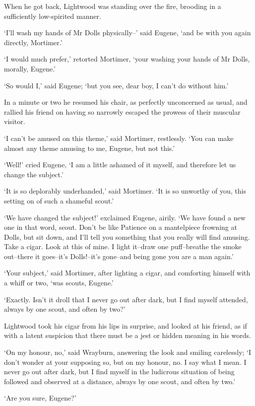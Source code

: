 When he got back, Lightwood was standing over the fire, brooding in a
sufficiently low-spirited manner.

‘I’ll wash my hands of Mr Dolls physically--’ said Eugene, ‘and be with
you again directly, Mortimer.’

‘I would much prefer,’ retorted Mortimer, ‘your washing your hands of Mr
Dolls, morally, Eugene.’

‘So would I,’ said Eugene; ‘but you see, dear boy, I can’t do without
him.’

In a minute or two he resumed his chair, as perfectly unconcerned as
usual, and rallied his friend on having so narrowly escaped the prowess
of their muscular visitor.

‘I can’t be amused on this theme,’ said Mortimer, restlessly. ‘You can
make almost any theme amusing to me, Eugene, but not this.’

‘Well!’ cried Eugene, ‘I am a little ashamed of it myself, and therefore
let us change the subject.’

‘It is so deplorably underhanded,’ said Mortimer. ‘It is so unworthy of
you, this setting on of such a shameful scout.’

‘We have changed the subject!’ exclaimed Eugene, airily. ‘We have found
a new one in that word, scout. Don’t be like Patience on a mantelpiece
frowning at Dolls, but sit down, and I’ll tell you something that you
really will find amusing. Take a cigar. Look at this of mine. I
light it--draw one puff--breathe the smoke out--there it goes--it’s
Dolls!--it’s gone--and being gone you are a man again.’

‘Your subject,’ said Mortimer, after lighting a cigar, and comforting
himself with a whiff or two, ‘was scouts, Eugene.’

‘Exactly. Isn’t it droll that I never go out after dark, but I find
myself attended, always by one scout, and often by two?’

Lightwood took his cigar from his lips in surprise, and looked at his
friend, as if with a latent suspicion that there must be a jest or
hidden meaning in his words.

‘On my honour, no,’ said Wrayburn, answering the look and smiling
carelessly; ‘I don’t wonder at your supposing so, but on my honour, no.
I say what I mean. I never go out after dark, but I find myself in the
ludicrous situation of being followed and observed at a distance, always
by one scout, and often by two.’

‘Are you sure, Eugene?’

